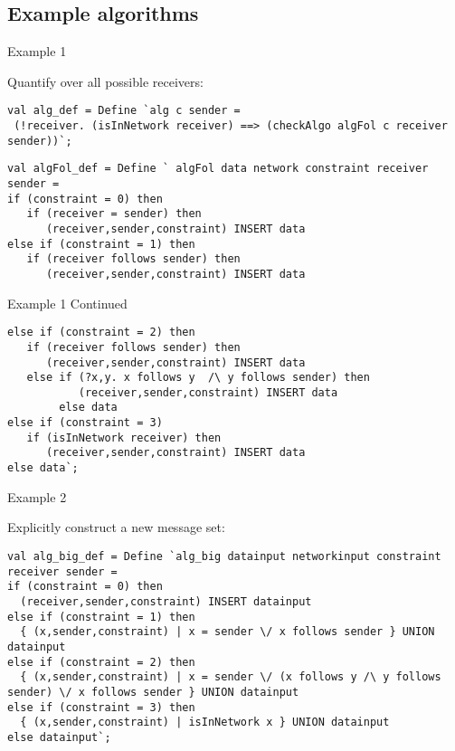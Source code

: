 \documentclass[10pt,a4paper]{beamer}
\begin{document}
\subsection{Example algorithms}

\begin{frame}[fragile]{Example 1}

Quantify over all possible receivers:
\begin{lstlisting}
val alg_def = Define `alg c sender = 
 (!receiver. (isInNetwork receiver) ==> (checkAlgo algFol c receiver sender))`;
\end{lstlisting}

\begin{lstlisting}
val algFol_def = Define ` algFol data network constraint receiver sender =
if (constraint = 0) then 
   if (receiver = sender) then
      (receiver,sender,constraint) INSERT data
else if (constraint = 1) then
   if (receiver follows sender) then
      (receiver,sender,constraint) INSERT data
\end{lstlisting}
\end{frame}
\begin{frame}[fragile]{Example 1 Continued}
\begin{lstlisting}
else if (constraint = 2) then
   if (receiver follows sender) then
      (receiver,sender,constraint) INSERT data
   else if (?x,y. x follows y  /\ y follows sender) then
           (receiver,sender,constraint) INSERT data
		else data
else if (constraint = 3)
   if (isInNetwork receiver) then
      (receiver,sender,constraint) INSERT data
else data`;
\end{lstlisting}

\end{frame}

\begin{frame}[fragile]{Example 2}

Explicitly construct a new message set:
\begin{lstlisting}
val alg_big_def = Define `alg_big datainput networkinput constraint receiver sender = 
if (constraint = 0) then 
  (receiver,sender,constraint) INSERT datainput 
else if (constraint = 1) then 
  { (x,sender,constraint) | x = sender \/ x follows sender } UNION datainput
else if (constraint = 2) then 
  { (x,sender,constraint) | x = sender \/ (x follows y /\ y follows sender) \/ x follows sender } UNION datainput
else if (constraint = 3) then
  { (x,sender,constraint) | isInNetwork x } UNION datainput
else datainput`;
\end{lstlisting}

\end{frame}
\end{document}
